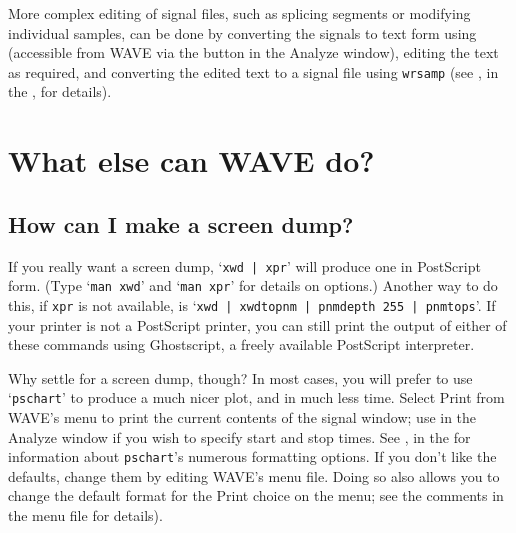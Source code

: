 \documentclass[twoside]{book}
\newcommand{\button}[1]{\cornersize{2}\ovalbox{\rule[-.3mm]{0cm}{2.5mm}\small\sf ~#1~}}
\newcommand{\menubutton}[1]{\button{#1~\ensuremath{\nabla}}}
\newcommand{\WAVE}{{\sf WAVE}\xspace}
\begin{document}
More complex editing of signal files, such as splicing segments or
modifying individual samples, can be done by converting the signals to
text form using
(accessible from \WAVE{} via the
\button{List samples} button in the {\sf Analyze} window), editing the
text as required, and converting the edited text to a signal file
using {\tt wrsamp} (see
, in the
,
for details).

\section{What else can \WAVE{} do?}

\subsection{How can I make a screen dump?}

If you really want a screen dump, `{\tt xwd | xpr}' will produce one in
PostScript form.  (Type `{\tt man xwd}' and `{\tt man xpr}' for details
on options.)  Another way to do this, if {\tt xpr} is not available, is
`{\tt xwd | xwdtopnm | pnmdepth 255 | pnmtops}'.  If your printer is not a
PostScript printer, you can still print the output of either of these
commands using Ghostscript, a freely available PostScript interpreter.

Why settle for a screen dump, though?  In most cases, you will prefer to use
`{\tt pschart}' to produce a much nicer plot, and in much less time.  Select
{\sf Print} from \WAVE{}'s \menubutton{File} menu to print the current contents
of the signal window;  use \button{Print chart} in the {\sf Analyze} window
if you wish to specify start and stop times.  See
, in the
for information about {\tt pschart}'s
numerous formatting options.  If you don't like the defaults, change them by
editing \WAVE{}'s menu file.  Doing so also allows you to change the
default format for the {\sf Print} choice on the \menubutton{File} menu;  see
the comments in the menu file for details).
\end{document}
